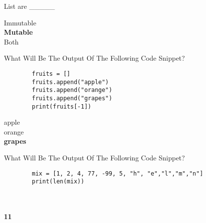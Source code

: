 \documentclass{exam}
\begin{document}
\begin{questions}
    \question List are \_\_\_\_\_

    \begin{oneparchoices}
        \choice Immutable \\
        \choice \textbf{Mutable} \\
        \choice Both
    \end{oneparchoices}

    \question What Will Be The Output Of The Following Code Snippet?

    \begin{verbatim}
        fruits = []
        fruits.append("apple")
        fruits.append("orange")
        fruits.append("grapes")
        print(fruits[-1])
    \end{verbatim}

    \begin{oneparchoices}
        \choice apple \\ 
        \choice orange \\
        \choice \textbf{grapes}
    \end{oneparchoices}

    \question What Will Be The Output Of The Following Code Snippet?

    \begin{verbatim}
        mix = [1, 2, 4, 77, -99, 5, "h", "e","l","m","n"]
        print(len(mix))
    \end{verbatim}

    \begin{oneparchoices}
         \\
         \\
        \choice \textbf{11}
    \end{oneparchoices}
\end{questions}
\end{document}
